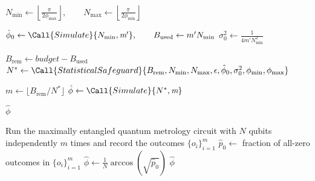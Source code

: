 \begin{algorithm}
    \caption{Estimate $\phi$ by ``Reverse engineering'' $N$}
    \label{alg:reverse-engineering}
    \begin{algorithmic}
        \State $N_\text{min} \gets \left\lfloor\frac{\pi}{2 \phi_\text{max}}\right\rfloor,
            \qquad N_\text{max} \gets \left\lfloor\frac{\pi}{2 \phi_\text{min}}\right\rfloor$

        \State $\hat \phi_0 \gets \Call{Simulate}{N_\text{min}, \textit{m}'},
            \qquad B_\text{used} \gets m' N_\text{min}$
        \State $\sigma_0^2 \gets \frac{1}{4m'N_\text{min}^2}$

        \State $B_\text{rem} \gets \textit{budget} - B_\text{used}$
        \State $N^* \gets \Call{StatisticalSafeguard}{B_\text{rem}, N_\text{min}, N_\text{max}, \epsilon, \hat\phi_0, \sigma_0^2, \phi_\text{min}, \phi_\text{max}}$


        \State $m \gets \lfloor B_\text{rem} / N^*\rfloor$
        \State $\hat \phi \gets \Call{Simulate}{N^*, \textit{m}}$

        \State \Return $\hat\phi$

        \EndProcedure
    \end{algorithmic}
\end{algorithm}

\begin{algorithm}
    \caption{Simulate $\hat \phi$ using the maximally entangled protocol}
    \label{alg:simulate}
    \begin{algorithmic}
        \State Run the maximally entangled quantum metrology circuit with $N$ qubits
        independently \textit{$m$} times and record the outcomes $\{o_i\}_{i=1}^m$
        \State $\hat p_0 \gets$ fraction of all-zero outcomes in $\{o_i\}_{i=1}^m$
        \State $\hat\phi \gets \frac 1 N \arccos(\sqrt{\hat p_0})$
        \State \Return $\hat\phi$
        \EndProcedure
    \end{algorithmic}
\end{algorithm}

